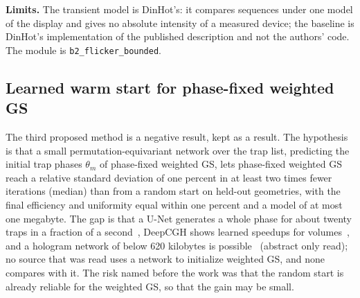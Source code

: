 \textbf{Limits.} The transient model is DinHot's: it compares sequences under one model of the display and gives no absolute intensity of a measured device; the baseline is DinHot's implementation of the published description and not the authors' code. The module is \texttt{b2\_flicker\_bounded}.

\subsection{Learned warm start for phase-fixed weighted GS}\label{sec:b3}

The third proposed method is a negative result, kept as a result. The hypothesis is that a small permutation-equivariant network over the trap list, predicting the initial trap phases $\theta_m$ of phase-fixed weighted GS, lets phase-fixed weighted GS reach a relative standard deviation of one percent in at least two times fewer iterations (median) than from a random start on held-out geometries, with the final efficiency and uniformity equal within one percent and a model of at most one megabyte. The gap is that a U-Net generates a whole phase for about twenty traps in a fraction of a second~\cite{ren2024}, DeepCGH shows learned speedups for volumes~\cite{eybposh}, and a hologram network of below 620 kilobytes is possible~\cite{shi2021} (abstract only read); no source that was read uses a network to initialize weighted GS, and none compares with it. The risk named before the work was that the random start is already reliable for the weighted GS, so that the gain may be small.

